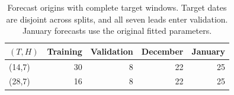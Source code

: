 \begin{table}[!htbp]
\centering\small
\caption{Forecast origins with complete target windows. Target dates are disjoint across splits, and all seven leads enter validation. January forecasts use the original fitted parameters.}
\label{tab:revision_protocol}
\begin{tabular}{lrrrr}
\toprule
\((T,H)\) & Training & Validation & December & January \\
\midrule
(14,7) & 30 & 8 & 22 & 25 \\
(28,7) & 16 & 8 & 22 & 25 \\
\bottomrule
\end{tabular}
\end{table}
